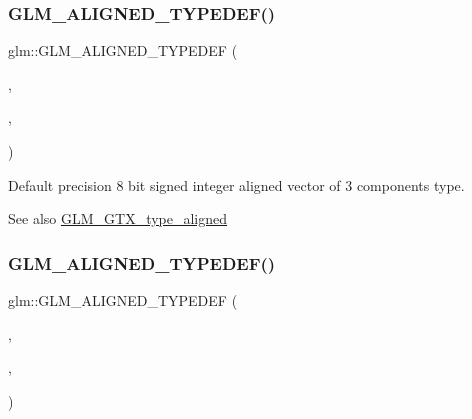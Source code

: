 \subsubsection{\texorpdfstring{G\+L\+M\+\_\+\+A\+L\+I\+G\+N\+E\+D\+\_\+\+T\+Y\+P\+E\+D\+E\+F()}{GLM\_ALIGNED\_TYPEDEF()}\hspace{0.1cm}{\footnotesize\ttfamily [55/209]}}
{\footnotesize\ttfamily glm\+::\+G\+L\+M\+\_\+\+A\+L\+I\+G\+N\+E\+D\+\_\+\+T\+Y\+P\+E\+D\+EF (\begin{DoxyParamCaption}\item[{\hyperlink{group__gtc__type__precision_ga97a6cae79db311cdd47c4e88a5855987}{i8vec3}}]{,  }\item[{aligned\+\_\+i8vec3}]{,  }\item[{4}]{ }\end{DoxyParamCaption})}

Default precision 8 bit signed integer aligned vector of 3 components type. \begin{DoxySeeAlso}{See also}
\hyperlink{group__gtx__type__aligned}{G\+L\+M\+\_\+\+G\+T\+X\+\_\+type\+\_\+aligned} 
\end{DoxySeeAlso}
\mbox{\label{group__gtx__type__aligned_ga1fe6fc032a978f1c845fac9aa0668714}} 
\subsubsection{\texorpdfstring{G\+L\+M\+\_\+\+A\+L\+I\+G\+N\+E\+D\+\_\+\+T\+Y\+P\+E\+D\+E\+F()}{GLM\_ALIGNED\_TYPEDEF()}\hspace{0.1cm}{\footnotesize\ttfamily [56/209]}}
{\footnotesize\ttfamily glm\+::\+G\+L\+M\+\_\+\+A\+L\+I\+G\+N\+E\+D\+\_\+\+T\+Y\+P\+E\+D\+EF (\begin{DoxyParamCaption}\item[{\hyperlink{group__gtc__type__precision_gafbf10a778016eba57d44beb585f2dc49}{i8vec4}}]{,  }\item[{aligned\+\_\+i8vec4}]{,  }\item[{4}]{ }\end{DoxyParamCaption})}

